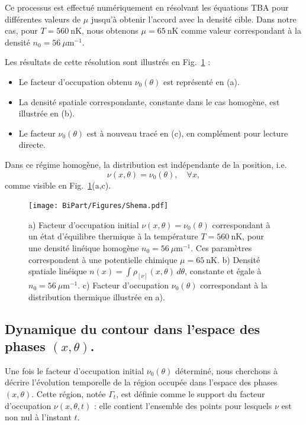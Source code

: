 Ce processus est effectué numériquement en résolvant les équations TBA pour différentes valeurs de $\mu$ jusqu’à obtenir l’accord avec la densité cible. Dans notre cas, pour $T = 560~\mathrm{nK}$, nous obtenons $\mu = 65~\mathrm{nK}$ comme valeur correspondant à la densité $n_0 = 56~\mu\mathrm{m}^{-1}$.

Les résultats de cette résolution sont illustrés en Fig.~\ref{fig:BiPart.insitut} :
\begin{itemize}[label = $\bullet$]
    \item Le facteur d’occupation obtenu $\nu_0(\theta)$ est représenté en (a).
    \item La densité spatiale correspondante, constante dans le cas homogène, est illustrée en (b).
    \item Le facteur $\nu_0(\theta)$ est à nouveau tracé en (c), en complément pour lecture directe.
\end{itemize}

Dans ce régime homogène, la distribution est indépendante de la position, i.e.
\begin{equation}
\nu(x, \theta) = \nu_0(\theta), \quad \forall x,
\end{equation}
comme visible en Fig.~\ref{fig:BiPart.insitut}(a,c).


\begin{figure}[!htb]
	\centering
	\texttt{[image: BiPart/Figures/Shema.pdf]}	
	\caption{a) Facteur d’occupation initial $\nu(x, \theta) = \nu_0(\theta)$ correspondant à un état d’équilibre thermique à la température $T = 560~\mathrm{nK}$, pour une densité linéique homogène $n_0 = 56~\mu\mathrm{m}^{-1}$. Ces paramètres correspondent à une potentielle chimique $\mu = 65~\mathrm{nK}$.
b) Densité spatiale linéique $n(x) = \int \rho_{[\nu]}(x, \theta)\, d\theta$, constante et égale à $n_0 = 56~\mu\mathrm{m}^{-1}$.
c) Facteur d’occupation $\nu_0(\theta)$ correspondant à la distribution thermique illustrée en a).}
	\label{fig:BiPart.insitut}
\end{figure}


\subsection{Dynamique du contour dans l’espace des phases $(x, \theta)$.}
\label{sec:contour_GHD}

Une fois le facteur d’occupation initial $\nu_0(\theta)$ déterminé, nous cherchons à décrire l’évolution temporelle de la région occupée dans l’espace des phases $(x,\theta)$. Cette région, notée $\Gamma_t$, est définie comme le support du facteur d’occupation $\nu(x,\theta,t)$ : elle contient l’ensemble des points pour lesquels $\nu$ est non nul à l’instant $t$.


